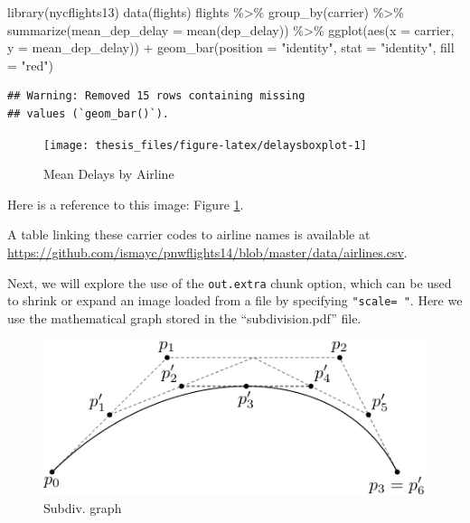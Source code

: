 \documentclass[print]{nuthesis}
\newenvironment{Shaded}{\begin{snugshade}}{\end{snugshade}}
\newcommand{\AttributeTok}[1]{\textcolor[rgb]{0.77,0.63,0.00}{#1}}
\newcommand{\FunctionTok}[1]{\textcolor[rgb]{0.00,0.00,0.00}{#1}}
\newcommand{\NormalTok}[1]{#1}
\newcommand{\SpecialCharTok}[1]{\textcolor[rgb]{0.00,0.00,0.00}{#1}}
\newcommand{\StringTok}[1]{\textcolor[rgb]{0.31,0.60,0.02}{#1}}
\begin{document}
\begin{Shaded}
\begin{Highlighting}[]
\FunctionTok{library}\NormalTok{(nycflights13)}
\FunctionTok{data}\NormalTok{(flights)}
\NormalTok{flights }\SpecialCharTok{\%\textgreater{}\%}
    \FunctionTok{group\_by}\NormalTok{(carrier) }\SpecialCharTok{\%\textgreater{}\%}
    \FunctionTok{summarize}\NormalTok{(}\AttributeTok{mean\_dep\_delay =} \FunctionTok{mean}\NormalTok{(dep\_delay)) }\SpecialCharTok{\%\textgreater{}\%}
    \FunctionTok{ggplot}\NormalTok{(}\FunctionTok{aes}\NormalTok{(}\AttributeTok{x =}\NormalTok{ carrier, }\AttributeTok{y =}\NormalTok{ mean\_dep\_delay)) }\SpecialCharTok{+}
    \FunctionTok{geom\_bar}\NormalTok{(}\AttributeTok{position =} \StringTok{"identity"}\NormalTok{, }\AttributeTok{stat =} \StringTok{"identity"}\NormalTok{,}
        \AttributeTok{fill =} \StringTok{"red"}\NormalTok{)}
\end{Highlighting}
\end{Shaded}

\begin{verbatim}
## Warning: Removed 15 rows containing missing
## values (`geom_bar()`).
\end{verbatim}

\begin{figure}
\texttt{[image: thesis\_files/figure-latex/delaysboxplot-1]} \caption{Mean Delays by Airline}\label{fig:delaysboxplot}
\end{figure}

Here is a reference to this image: Figure \ref{fig:delaysboxplot}.

A table linking these carrier codes to airline names is available at \url{https://github.com/ismayc/pnwflights14/blob/master/data/airlines.csv}.

\clearpage

Next, we will explore the use of the \texttt{out.extra} chunk option, which can be used to shrink or expand an image loaded from a file by specifying \texttt{"scale=\ "}. Here we use the mathematical graph stored in the ``subdivision.pdf'' file.

\begin{figure}
\includegraphics[width=\linewidth,scale=0.75]{figure/subdivision} \caption{Subdiv. graph}\label{fig:subd}
\end{figure}
\end{document}
